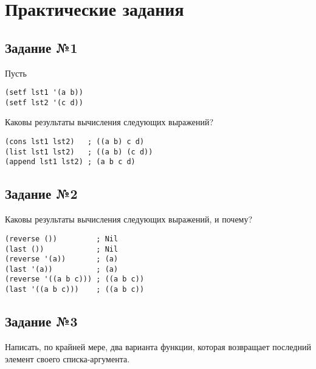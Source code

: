 \chapter{Практические задания}

\section{Задание №1}

Пусть

\vspace{4mm}
\hfill
\begin{minipage}{0.92\linewidth}
\begin{lstlisting}
(setf lst1 '(a b))
(setf lst2 '(c d))
\end{lstlisting}
\end{minipage}

Каковы результаты вычисления следующих выражений?

\vspace{4mm}
\hfill
\begin{minipage}{0.92\linewidth}
\begin{lstlisting}
(cons lst1 lst2)   ; ((a b) c d)
(list lst1 lst2)   ; ((a b) (c d))
(append lst1 lst2) ; (a b c d)
\end{lstlisting}
\end{minipage}

\section{Задание №2}

Каковы результаты вычисления следующих выражений, и почему?

\vspace{4mm}
\begin{minipage}{0.92\linewidth}
\begin{lstlisting}
(reverse ())         ; Nil
(last ())            ; Nil
(reverse '(a))       ; (a)
(last '(a))          ; (a)
(reverse '((a b c))) ; ((a b c))
(last '((a b c)))    ; ((a b c))
\end{lstlisting}
\end{minipage}

\section{Задание №3}

Написать, по крайней мере, два варианта функции, которая возвращает
последний элемент своего списка-аргумента.

